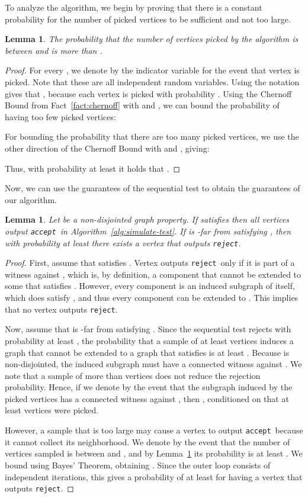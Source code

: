 \documentclass[11pt]{article}
\newtheorem{lemma}[theorem]{Lemma}
\newcommand{\accept}{\texttt{accept}}
\newcommand{\reject}{\texttt{reject}}
\begin{document}
	
	
To analyze the algorithm, we begin by proving that there is a constant probability for the number of picked vertices to be sufficient and not too large.
\begin{lemma}
\label{lem:q}
The probability that the number of vertices picked by the algorithm is between  and  is more than  .
\end{lemma}
\begin{proof}
For every , we denote by  the indicator variable for the event that vertex  is picked.
Note that these are all independent random variables. Using the notation  gives that , because each vertex is picked with probability .
Using the Chernoff Bound from Fact~\ref{fact:chernoff} with  and , we can bound the probability of having too few picked vertices:

For bounding the probability that there are too many picked vertices, we use the other direction of the Chernoff Bound with  and , giving:

Thus, with probability at least  it holds that .
\end{proof}


Now, we can use the guarantees of the sequential test to obtain the guarantees of our algorithm.
\begin{lemma}
\label{lemma:correctness}
Let  be a non-disjointed graph property. If  satisfies  then all vertices output \accept ~in Algorithm~\ref{alg:simulate-test}. If  is -far from satisfying , then with probability at least  there exists a vertex that outputs \reject.
\end{lemma}
	
\begin{proof}
First, assume that  satisfies . Vertex  outputs \reject~only if it is part of a witness against , which is, by definition, a component that cannot be extended to some  that satisfies . However, every component is an induced subgraph of  itself, which does satisfy , and thus every component can be extended to . This implies that no vertex  outputs \reject.

Now, assume that  is -far from satisfying . Since the sequential test rejects with probability at least , the probability that a sample of at least  vertices induces a graph that cannot be extended to a graph that satisfies  is at least  . Because  is non-disjointed, the induced subgraph must have a connected witness against .
We note that a sample of more than  vertices does not reduce the rejection probability. Hence, if we denote by  the event that the subgraph induced by the picked vertices has a connected witness against , then , conditioned on that at least  vertices were picked.

However, a sample that is too large may cause a vertex to output \accept ~because it cannot collect its neighborhood. We denote by  the event that the number of vertices sampled is between  and , and by Lemma~\ref{lem:q} its probability is at least . We bound  using Bayes' Theorem, obtaining . Since the outer loop consists of  independent iterations, this gives a  probability of at least  for having a vertex that outputs \reject.
\end{proof}
\end{document}
